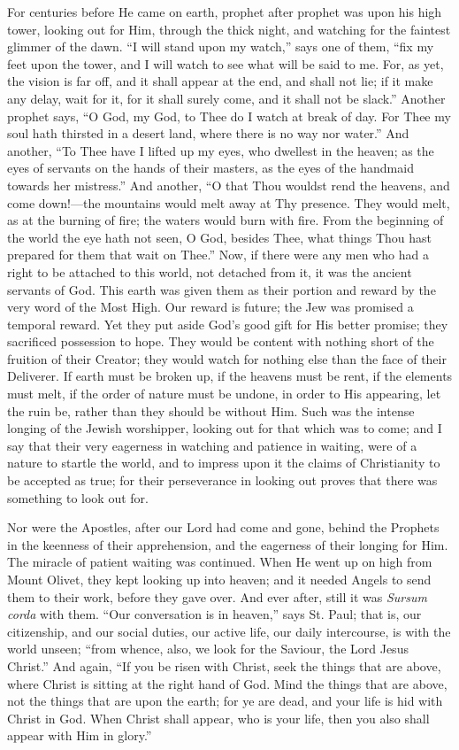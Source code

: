 For centuries before He came on earth, prophet after
prophet was upon his high tower, looking out for Him,
through the thick night, and watching for the faintest
glimmer of the dawn. ``I will stand upon my
watch,'' says one of them, ``fix my feet upon the
tower, and I will watch to see what will be said to me.
For, as yet, the vision is far off, and it shall appear
at the end, and shall not lie; if it make any delay, wait
for it, for it shall surely come, and it shall not be
slack.'' Another prophet says, ``O God, my God,
to Thee do I watch at break of day. For Thee my soul hath
thirsted in a desert land, where there is no way nor
water.'' And another, ``To Thee have I lifted up
my eyes, who dwellest in the heaven; as the eyes of
servants on the hands of their masters, as the eyes of
the handmaid towards her mistress.'' And another,
``O that Thou wouldst rend the heavens, and come
down!—the mountains would melt away at Thy presence.
They would melt, as at the burning of fire; the waters
would burn with fire. From the beginning of the world the
eye hath not seen, O God, besides Thee, what things Thou
hast prepared for them that wait on Thee.'' Now, if
there were any men who had a right to be attached to this
world, not detached from it, it was the ancient servants
of God. This earth was given them as their portion and
reward by the very word of the Most High. Our reward is
future; the Jew was promised a temporal reward. Yet they
put aside God's good gift for His better promise; they
sacrificed possession to hope. They would be content with
nothing short of the fruition of their Creator; they
would watch for nothing else than the face of their
Deliverer. If earth must be broken up, if the heavens
must be rent, if the elements must melt, if the order of
nature must be undone, in order to His appearing, let the
ruin be, rather than they should be without Him. Such was
the intense longing of the Jewish worshipper, looking out
for that which was to come; and I say that their very
eagerness in watching and patience in waiting, were of a
nature to startle the world, and to impress upon it the
claims of Christianity to be accepted as true; for their
perseverance in looking out proves that there was
something to look out for.

Nor were the Apostles, after our Lord had come and
gone, behind the Prophets in the keenness of their
apprehension, and the eagerness of their longing for Him.
The miracle of patient waiting was continued. When He
went up on high from Mount Olivet, they kept looking up
into heaven; and it needed Angels to send them to their
work, before they gave over. And ever after, still it was
\emph{Sursum corda} with them. ``Our conversation is
in heaven,'' says St. Paul; that is, our citizenship,
and our social duties, our active life, our daily
intercourse, is with the world unseen; ``from whence,
also, we look for the Saviour, the Lord Jesus
Christ.'' And again, ``If you be risen with
Christ, seek the things that are above, where Christ is
sitting at the right hand of God. Mind the things that
are above, not the things that are upon the earth; for ye
are dead, and your life is hid with Christ in God. When
Christ shall appear, who is your life, then you also
shall appear with Him in glory.''

